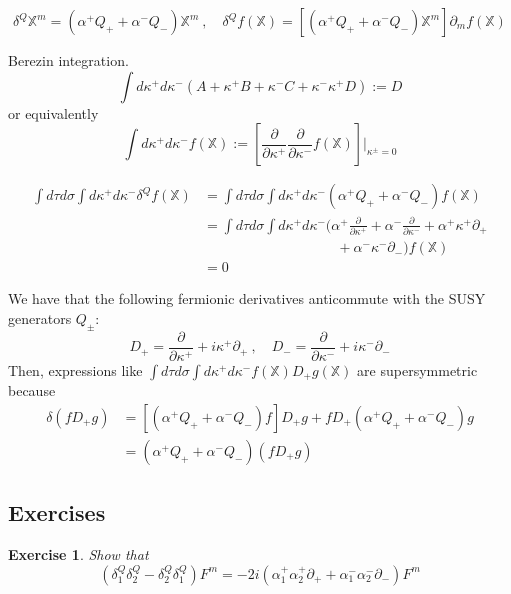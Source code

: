 \documentclass[a4paper,12pt]{article}
\newtheorem{exe}{Exercise}
\numberwithin{equation}{section}
\numberwithin{exe}{section}
\newcommand{\X}{{\mathbb X}}
\newcommand{\p}{{\partial}}
\renewcommand{\a}{{\alpha}}
\renewcommand{\d}{{\delta}}
\renewcommand{\k}{{\kappa}}
\newcommand{\s}{{\sigma}}
\begin{document}
	\begin{equation}
	\d^Q\X^m = (\a^+ Q_+ + \a^- Q_-)\X^m\ ,\quad \d^Q f(\X) = [(\a^+ Q_+ + \a^- Q_-)\X^m]\p_m f(\X)
	\end{equation}

Berezin integration.
	\begin{equation}
	\int d\k^+ d\k^- (A+ \k^+ B + \k^- C + \k^-\k^+ D) := D
	\end{equation}
or equivalently
	\begin{equation}
	\int d\k^+ d\k^- f(\X) := \left[ \frac{\p}{\p\k^+}\frac{\p}{\p\k^-} f(\X) \right]|_{\k^\pm=0}
	\end{equation}

	\begin{align}
	\int d\tau d\s \int d\k^+ d\k^- \d^Q f(\X) & = \int d\tau d\s \int d\k^+ d\k^- (\a^+ Q_+ + \a^- Q_-)f(\X) \nonumber \\
	& = \int d\tau d\s \int d\k^+ d\k^- \bigg(\a^+ \frac{\p}{\p\k^+} + \a^-\frac{\p}{\p\k^-} + \a^+ \k^+ \p_+ \nonumber \\
	& \hspace{4cm}  + \a^- \k^- \p_-\bigg) f(\X) \nonumber \\
	& = 0
	\end{align}

We have that the following fermionic derivatives anticommute with the SUSY generators $Q_\pm$:
	\begin{equation}
	D_+ = \frac{\p}{\p\k^+} + i\k^+\p_+\ ,\quad D_- = \frac{\p}{\p\k^-} + i\k^- \p_-
	\end{equation}
Then, expressions like $\int d\tau d\s \int d\k^+ d\k^- f(\X) D_+ g(\X)$ are supersymmetric because
	\begin{align}
	\d(fD_+ g) & = [(\a^+ Q_+ + \a^- Q_-) f]D_+ g + fD_+(\a^+ Q_+ + \a^- Q_-) g \nonumber \\
	& = (\a^+ Q_+ + \a^- Q_-)(fD_+ g)
	\end{align}


\subsection{Exercises}

	\begin{exe}
	Show that
		\begin{equation}
		(\d^Q_1 \d^Q_2 - \d^Q_2 \d^Q_1) F^m = -2 i (\a^+_1 \a^+_2 \p_+ + \a^-_1 \a^-_2 \p_-) F^m
		\end{equation}
	\end{exe}
\end{document}
